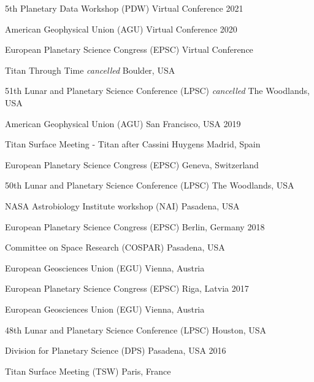 
\begin{cvhonors}

    \cvhonor
    {5th Planetary Data Workshop (PDW)}
    {}
    {Virtual Conference}
    {2021}

    \cvhonor
    {American Geophysical Union (AGU)}
    {}
    {Virtual Conference}
    {2020}

    \cvhonor
    {European Planetary Science Congress (EPSC)}
    {}
    {Virtual Conference}
    {}

    \cvhonor
    {Titan Through Time}
    {\textit{\scriptsize cancelled}}
    {Boulder, USA}
    {}

    \cvhonor
    {51th Lunar and Planetary Science Conference (LPSC)}
    {\textit{\scriptsize cancelled}}
    {The Woodlands, USA}
    {}

    \cvhonor
    {American Geophysical Union (AGU)}
    {}
    {San Francisco, USA}
    {2019}

    \cvhonor
    {Titan Surface Meeting - Titan after Cassini Huygens}
    {}
    {Madrid, Spain}
    {}

    \cvhonor
    {European Planetary Science Congress (EPSC)}
    {}
    {Geneva, Switzerland}
    {}

    \cvhonor
    {50th Lunar and Planetary Science Conference (LPSC)}
    {}
    {The Woodlands, USA}
    {}

    \cvhonor
    {NASA Astrobiology Institute workshop (NAI)}
    {}
    {Pasadena, USA}
    {}

    \cvhonor
    {European Planetary Science Congress (EPSC)}
    {}
    {Berlin, Germany}
    {2018}

    \cvhonor
    {Committee on Space Research (COSPAR)}
    {}
    {Pasadena, USA}
    {}

    \cvhonor
    {European Geosciences Union (EGU)}
    {}
    {Vienna, Austria}
    {}

    \cvhonor
    {European Planetary Science Congress (EPSC)}
    {}
    {Riga, Latvia}
    {2017}

  \cvhonor
    {European Geosciences Union (EGU)}
    {}
    {Vienna, Austria}
    {}

  \cvhonor
    {48th Lunar and Planetary Science Conference (LPSC)}
    {}
    {Houston, USA}
    {}

  \cvhonor
    {Division for Planetary Science (DPS)}
    {}
    {Pasadena, USA}
    {2016}

  \cvhonor
    {Titan Surface Meeting (TSW)}
    {}
    {Paris, France}
    {}


\end{cvhonors}
